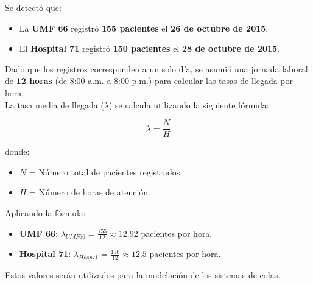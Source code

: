 \documentclass[10pt]{article}
\begin{document}
    Se detectó que:
    \begin{itemize}
        \item La \textbf{UMF 66} registró \textbf{155 pacientes} el \textbf{26 de octubre de 2015}.
        \item El \textbf{Hospital 71} registró \textbf{150 pacientes} el \textbf{28 de octubre de 2015}.
    \end{itemize}

    Dado que los registros corresponden a un solo día, se asumió una jornada laboral de \textbf{12 horas} (de 8:00 a.m. a 8:00 p.m.) para calcular las tasas de llegada por hora. \\

    La tasa media de llegada (\(\lambda\)) se calcula utilizando la siguiente fórmula:

    \[
    \lambda = \frac{N}{H}
    \]

    donde:
    \begin{itemize}
        \item \(N\) = Número total de pacientes registrados.
        \item \(H\) = Número de horas de atención.
    \end{itemize}

    Aplicando la fórmula:

    \begin{itemize}
        \item \textbf{UMF 66}: \(\lambda_{UMF66} = \frac{155}{12} \approx 12.92\) pacientes por hora.
        \item \textbf{Hospital 71}: \(\lambda_{Hosp71} = \frac{150}{12} \approx 12.5\) pacientes por hora.
    \end{itemize}

    Estos valores serán utilizados para la modelación de los sistemas de colas.
\end{document}
